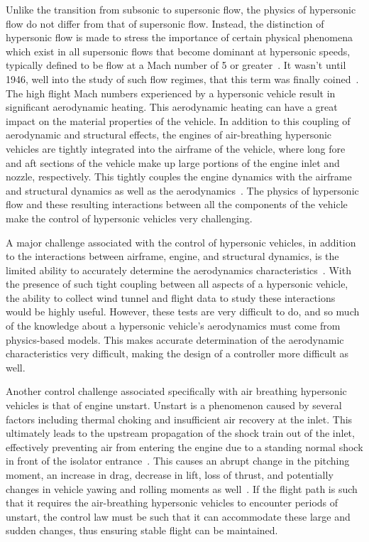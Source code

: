 Unlike the transition from subsonic to supersonic flow, the physics of hypersonic flow do not differ from that of supersonic flow.
Instead, the distinction of hypersonic flow is made to stress the importance of certain physical phenomena which exist in all supersonic flows that become dominant at hypersonic speeds, typically defined to be flow at a Mach number of 5 or greater\ \cite{anderson.aerodynamics.2010}.
It wasn't until 1946, well into the study of such flow regimes, that this term was finally coined\ \cite{Tsien2012443}.
The high flight Mach numbers experienced by a hypersonic vehicle result in significant aerodynamic heating.
This aerodynamic heating can have a great impact on the material properties of the vehicle.
In addition to this coupling of aerodynamic and structural effects, the engines of air-breathing hypersonic vehicles are tightly integrated into the airframe of the vehicle, where long fore and aft sections of the vehicle make up large portions of the engine inlet and nozzle, respectively.
This tightly couples the engine dynamics with the airframe and structural dynamics as well as the aerodynamics\ \cite{chavez.flightdynamics.1994}.
The physics of hypersonic flow and these resulting interactions between all the components of the vehicle make the control of hypersonic vehicles very challenging.

A major challenge associated with the control of hypersonic vehicles, in addition to the interactions between airframe, engine, and structural dynamics, is the limited ability to accurately determine the aerodynamics characteristics\ \cite{chavez.analytical.1994, coleman.hypersonic.2009, maughmer.prediction.1989, schmidt.dynamics.1991}.
With the presence of such tight coupling between all aspects of a hypersonic vehicle, the ability to collect wind tunnel and flight data to study these interactions would be highly useful.
However, these tests are very difficult to do, and so much of the knowledge about a hypersonic vehicle's aerodynamics must come from physics-based models.
This makes accurate determination of the aerodynamic characteristics very difficult, making the design of a controller more difficult as well.

Another control challenge associated specifically with air breathing hypersonic vehicles is that of engine unstart.
Unstart is a phenomenon caused by several factors including thermal choking and insufficient air recovery at the inlet.
This ultimately leads to the upstream propagation of the shock train out of the inlet, effectively preventing air from entering the engine due to a standing normal shock in front of the isolator entrance\ \cite{curran.scramjet.2000}.
This causes an abrupt change in the pitching moment, an increase in drag, decrease in lift, loss of thrust, and potentially changes in vehicle yawing and rolling moments as well\ \cite{bolender.unstart.2009}.
If the flight path is such that it requires the air-breathing hypersonic vehicles to encounter periods of unstart, the control law must be such that it can accommodate these large and sudden changes, thus ensuring stable flight can be maintained.

